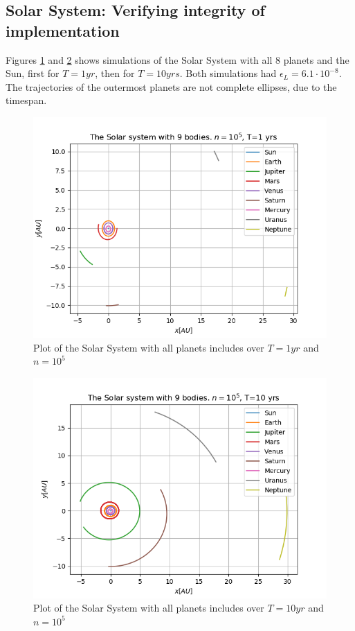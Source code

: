 \documentclass[%
oneside,                 %
final,                   %
10pt]{article}
\begin{document}
\subsection{Solar System: Verifying integrity of implementation}
Figures \ref{fig:ssplotT1} and \ref{fig:ssplotT10} shows simulations of the Solar System with all 8 planets and the Sun, first for $T=1yr$, then for $T=10yrs$. Both simulations had $\epsilon_L=6.1 \cdot 10^{-8}$. The trajectories of the outermost planets are not complete ellipses, due to the timespan.

\begin{figure}[!htb]
        \centering 
         \includegraphics[scale=.6]{../Results/SolarSyst9BodiesNj5T1.png} 
        \caption{Plot of the Solar System with all planets includes over $T=1 yr$ and $n=10^5$}
        \label{fig:ssplotT1}   
\end{figure}  


\begin{figure}[!htb]
        \centering 
         \includegraphics[scale=.6]{../Results/SolarSyst9BodiesNj5T10.png} 
        \caption{Plot of the Solar System with all planets includes over $T=10 yr$ and $n=10^5$}
        \label{fig:ssplotT10}   
\end{figure}  
\end{document}
